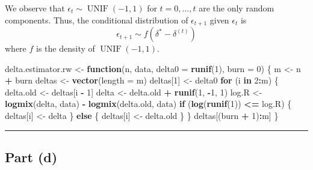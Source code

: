 \documentclass[
  11pt,
]{paper}
\newenvironment{Shaded}{\begin{snugshade}}{\end{snugshade}}
\newcommand{\AttributeTok}[1]{\textcolor[rgb]{0.13,0.29,0.53}{#1}}
\newcommand{\ControlFlowTok}[1]{\textcolor[rgb]{0.13,0.29,0.53}{\textbf{#1}}}
\newcommand{\DecValTok}[1]{\textcolor[rgb]{0.00,0.00,0.81}{#1}}
\newcommand{\FunctionTok}[1]{\textcolor[rgb]{0.13,0.29,0.53}{\textbf{#1}}}
\newcommand{\NormalTok}[1]{#1}
\newcommand{\OtherTok}[1]{\textcolor[rgb]{0.56,0.35,0.01}{#1}}
\newcommand{\SpecialCharTok}[1]{\textcolor[rgb]{0.81,0.36,0.00}{\textbf{#1}}}
\begin{document}
We observe that \(\epsilon_t \sim \operatorname{UNIF}(-1,1)\) for
\(t=0,\ldots,t\) are the only random components. Thus, the conditional
distribution of \(\epsilon_{t+1}\) given \(\epsilon_{t}\) is \[
  \epsilon_{t+1} \sim f(\delta^* - \delta^{(t)})
\] where \(f\) is the density of \(\operatorname{UNIF}(-1,1)\).

\begin{Shaded}
\begin{Highlighting}[]
\NormalTok{delta.estimator.rw }\OtherTok{\textless{}{-}} \ControlFlowTok{function}\NormalTok{(n, data, }\AttributeTok{delta0 =} \FunctionTok{runif}\NormalTok{(}\DecValTok{1}\NormalTok{), }\AttributeTok{burn =} \DecValTok{0}\NormalTok{) \{}
\NormalTok{    m }\OtherTok{\textless{}{-}}\NormalTok{ n }\SpecialCharTok{+}\NormalTok{ burn}
\NormalTok{    deltas }\OtherTok{\textless{}{-}} \FunctionTok{vector}\NormalTok{(}\AttributeTok{length =}\NormalTok{ m)}
\NormalTok{    deltas[}\DecValTok{1}\NormalTok{] }\OtherTok{\textless{}{-}}\NormalTok{ delta0}
    \ControlFlowTok{for}\NormalTok{ (i }\ControlFlowTok{in} \DecValTok{2}\SpecialCharTok{:}\NormalTok{m) \{}
\NormalTok{        delta.old }\OtherTok{\textless{}{-}}\NormalTok{ deltas[i }\SpecialCharTok{{-}} \DecValTok{1}\NormalTok{]}
\NormalTok{        delta }\OtherTok{\textless{}{-}}\NormalTok{ delta.old }\SpecialCharTok{+} \FunctionTok{runif}\NormalTok{(}\DecValTok{1}\NormalTok{, }\SpecialCharTok{{-}}\DecValTok{1}\NormalTok{, }\DecValTok{1}\NormalTok{)}
\NormalTok{        log.R }\OtherTok{\textless{}{-}} \FunctionTok{logmix}\NormalTok{(delta, data) }\SpecialCharTok{{-}} \FunctionTok{logmix}\NormalTok{(delta.old, data)}
        \ControlFlowTok{if}\NormalTok{ (}\FunctionTok{log}\NormalTok{(}\FunctionTok{runif}\NormalTok{(}\DecValTok{1}\NormalTok{)) }\SpecialCharTok{\textless{}=}\NormalTok{ log.R) \{}
\NormalTok{            deltas[i] }\OtherTok{\textless{}{-}}\NormalTok{ delta}
\NormalTok{        \} }\ControlFlowTok{else}\NormalTok{ \{}
\NormalTok{            deltas[i] }\OtherTok{\textless{}{-}}\NormalTok{ delta.old}
\NormalTok{        \}}
\NormalTok{    \}}
\NormalTok{    deltas[(burn }\SpecialCharTok{+} \DecValTok{1}\NormalTok{)}\SpecialCharTok{:}\NormalTok{m]}
\NormalTok{\}}
\end{Highlighting}
\end{Shaded}

\begin{center}\rule{0.5\linewidth}{0.5pt}\end{center}

\hypertarget{part-d}{%
\subsection{Part (d)}\label{part-d}}
\end{document}
